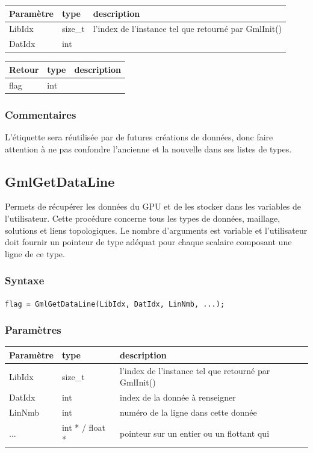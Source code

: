 \documentclass[a4paper,12pt]{article}
\begin{document}
\begin{tabular}{|m{2cm}|m{1.5cm}|m{10.5cm}|}
\hline
Paramètre  & type    & description \\
\hline
LibIdx     & size\_t & l'index de l'instance tel que retourné par GmlInit() \\
\hline
DatIdx     & int     & \\
\hline
\end{tabular}

\medskip

\begin{tabular}{|m{2cm}|m{1.5cm}|m{10.5cm}|}
\hline
Retour     & type   & description \\
\hline
flag       & int    & \\
\hline
\end{tabular}

\subsubsection*{Commentaires}
L'étiquette sera réutilisée par de futures créations de données, donc faire attention à ne pas confondre l'ancienne et la nouvelle dans ses listes de types.


\subsection{GmlGetDataLine}

Permets de récupérer les données du GPU et de les stocker dans les variables de l'utilisateur.
Cette procédure concerne tous les types de données, maillage, solutions et liens topologiques.
Le nombre d'arguments est variable et l'utilisateur doit fournir un pointeur de type adéquat pour chaque scalaire composant une ligne de ce type.

\subsubsection*{Syntaxe}

{\tt flag = GmlGetDataLine(LibIdx, DatIdx, LinNmb, ...);}

\subsubsection*{Paramètres}

\begin{tabular}{|m{2cm}|m{1.5cm}|m{10.5cm}|}
\hline
Paramètre  & type            & description \\
\hline
LibIdx     & size\_t         & l'index de l'instance tel que retourné par GmlInit() \\
\hline
DatIdx     & int             & index de la donnée à renseigner \\
\hline
LinNmb     & int             & numéro de la ligne dans cette donnée \\
\hline
...        & int * / float * & pointeur sur un entier ou un flottant qui \\
\hline
\end{tabular}
\end{document}
